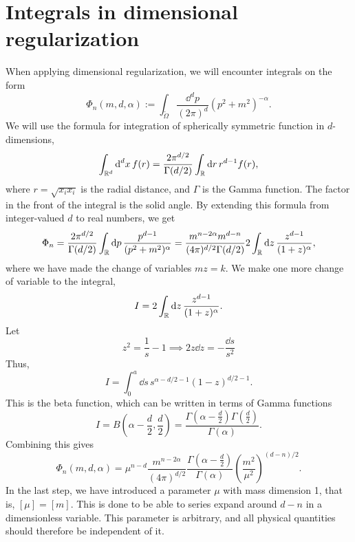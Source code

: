 \section{Integrals in dimensional regularization}
\label{section: integral}


When applying dimensional regularization, we will encounter integrals on the form
%
\begin{equation}
    \label{def dimreg integral}
    \Phi_n(m, d, \alpha) 
    := \int_{\tilde \Omega} \frac{\dd^d p}{(2 \pi)^d} (p^2 + m^2)^{-\alpha}.
\end{equation}
%
We will use the formula for integration of spherically symmetric function in $d$-dimensions,
%
\begin{equation}
    \int_{\mathbb{R}^d} \text{d}^d x \, f(r) 
    = \frac{2 \pi^{d/2}}{\Gamma(d/2)} \int_{\mathbb{R}} \text{d} r \, r^{d-1}f(r),
\end{equation}
where $r = \sqrt{x_i x_i}$ is the radial distance, and $\Gamma$ is the Gamma function.
The factor in the front of the integral is the solid angle.
By extending this formula from integer-valued $d$ to real numbers, we get
%
\begin{equation}
    \Phi_n
    = \frac{2 \pi^{d/2} }{\Gamma(d/2)} \int_{\mathbb{R}} \text{d} p \, 
    \frac{p^{d-1}}{(p^2 + m^2)^\alpha}
    = \frac{m^{n-2\alpha}m^{d-n} }{(4 \pi)^{d / 2}\Gamma(d/2)} 
    2 \int_{\mathbb{R}} \text{d} z \, \frac{z^{d - 1}}{(1 + z)^\alpha}, 
\end{equation}
%
where we have made the change of variables $m z = k$.
We make one more change of variable to the integral,
%
\begin{equation}
    I = 2 \int_{\mathbb{R}} \text{d} z \, \frac{z^{d - 1}}{(1 + z)^\alpha}.
\end{equation}
%
Let
%
\begin{equation}
    z^2 = \frac{1}{s} - 1 \implies 2 z \dd z = - \frac{\dd s}{s^2}
\end{equation}
%
Thus,
%
\begin{equation}
    I = \int_0^a \dd s \, s^{\alpha - d/2 - 1} (1 - z)^{d/2 - 1}.
\end{equation}
%
This is the beta function, which can be written in terms of Gamma functions~\autocite{peskinIntroductionQuantumField1995}
%
\begin{equation}
    I = B\left(\alpha - \frac{d}{2}, \frac{d}{2}\right) 
    = \frac{\Gamma\left(\alpha - \frac{d}{2}\right) \Gamma\left(\frac{d}{2}\right)}{\Gamma(\alpha)}.
\end{equation}
%
Combining this gives
%
\begin{equation}
    \label{result dimreg}
    \Phi_n(m, d, \alpha) 
    = \mu^{n-d} \frac{m^{n - 2\alpha}}{(4 \pi)^{d / 2}}
    \frac{
        \Gamma \left(\alpha - \frac{d}{2} \right) 
    }
    {\Gamma(\alpha)}
    \left(\frac{m^2}{\mu^2}\right)^{(d-n)/2 }
    .
\end{equation}
%
In the last step, we have introduced a parameter $\mu$ with mass dimension 1, that is, $[\mu] = [m]$.
This is done to be able to series expand around $d - n$ in a dimensionless variable. 
This parameter is arbitrary, and all physical quantities should therefore be independent of it.



